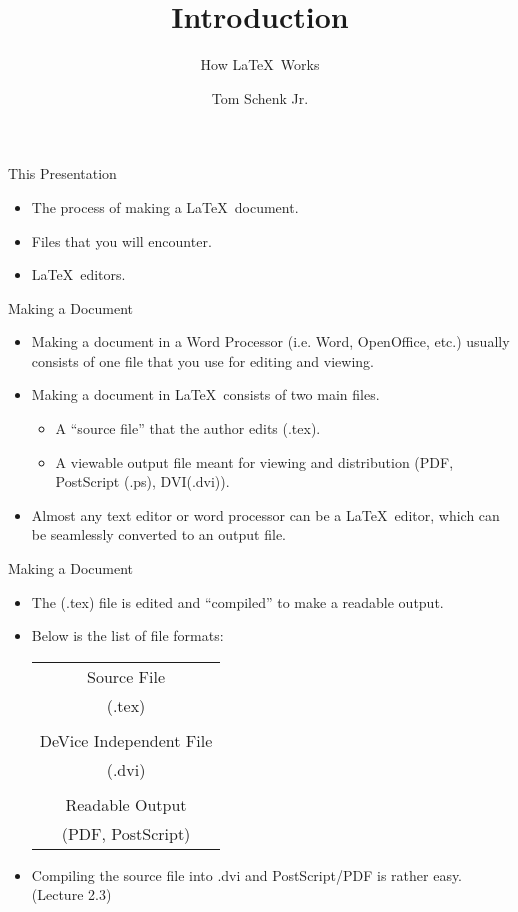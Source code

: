 \documentclass[pdf]{prosper}
\title{Introduction}
\subtitle{How \LaTeX\ Works}
\author{Tom Schenk Jr.}
\begin{document}
\maketitle
\begin{slide}{This Presentation}
	\begin{itemize}
		\item The process of making a \LaTeX\ document.
		\item Files that you will encounter.
		\item \LaTeX\ editors.
	\end{itemize}
\end{slide}
\begin{slide}{Making a Document}
	\begin{itemize}
		\item Making a document in a Word Processor (i.e. Word, OpenOffice, etc.) usually consists of one file that you use for editing and viewing.
		\item Making a document in \LaTeX\ consists of two main files.
			\begin{itemize}
				\item A ``source file'' that the author edits (.tex).
				\item A viewable output file meant for viewing and distribution (PDF, PostScript (.ps), DVI(.dvi)).
			\end{itemize}
		\item Almost any text editor or word processor can be a \LaTeX\ editor, which can be seamlessly converted to an output file.
	\end{itemize}
\end{slide}
\begin{slide}{Making a Document}
	\begin{itemize}
		\item The (.tex) file is edited and ``compiled'' to make a readable output.
		\item Below is the list of file formats: \\
\begin{tabular}{|c|}
\hline
Source File \\
(.tex) \\
\hline \\
DeVice Independent File \\
(.dvi) \\
\hline \\
Readable Output \\
(PDF, PostScript) \\
\hline
\end{tabular}
		\item Compiling the source file into .dvi and PostScript/PDF is rather easy. (Lecture 2.3)
	\end{itemize}
\end{slide}
\end{document}
